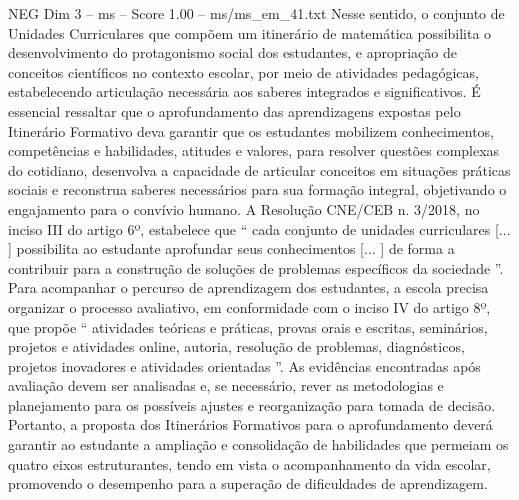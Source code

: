 \begin{textsample}{NEG Dim 3 – ms – Score 1.00 – ms/ms\_em\_41.txt}
Nesse sentido, o conjunto de Unidades Curriculares que compõem um itinerário de matemática possibilita o desenvolvimento do protagonismo social dos estudantes, e apropriação de conceitos científicos no contexto escolar, por meio de atividades pedagógicas, estabelecendo articulação necessária aos saberes integrados e significativos.
É essencial ressaltar que o aprofundamento das aprendizagens expostas pelo Itinerário Formativo deva garantir que os estudantes mobilizem conhecimentos, competências e habilidades, atitudes e valores, para resolver questões complexas do cotidiano, desenvolva a capacidade de articular conceitos em situações práticas sociais e reconstrua saberes necessários para sua formação integral, objetivando o engajamento para o convívio humano.
A Resolução CNE/CEB n. 3/2018, no inciso III do artigo 6º, estabelece que “ cada conjunto de unidades curriculares [... ] possibilita ao estudante aprofundar seus conhecimentos [... ] de forma a contribuir para a construção de soluções de problemas específicos da sociedade ”.
Para acompanhar o percurso de aprendizagem dos estudantes, a escola precisa organizar o processo avaliativo, em conformidade com o inciso IV do artigo 8º, que propõe “ atividades teóricas e práticas, provas orais e escritas, seminários, projetos e atividades online, autoria, resolução de problemas, diagnósticos, projetos inovadores e atividades orientadas ”.
As evidências encontradas após avaliação devem ser analisadas e, se necessário, rever as metodologias e planejamento para os possíveis ajustes e reorganização para tomada de decisão.
Portanto, a proposta dos Itinerários Formativos para o aprofundamento deverá garantir ao estudante a ampliação e consolidação de habilidades que permeiam os quatro eixos estruturantes, tendo em vista o acompanhamento da vida escolar, promovendo o desempenho para a superação de dificuldades de aprendizagem.

\end{textsample}
